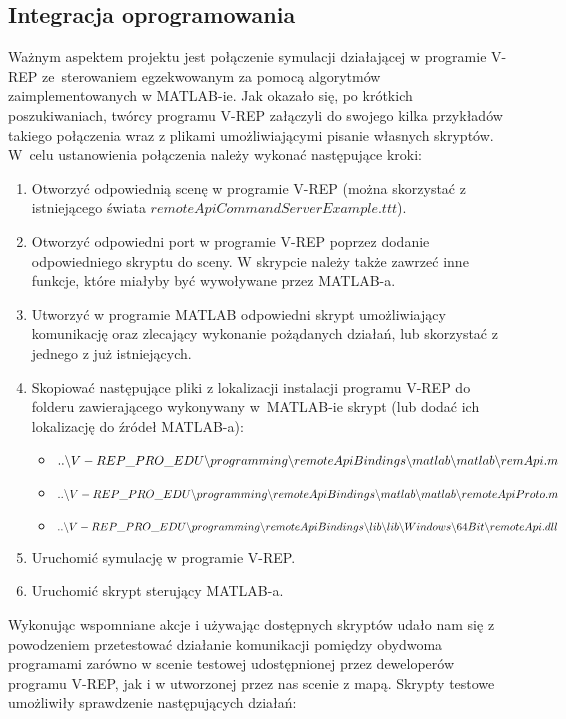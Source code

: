 \documentclass[11pt, a4paper, twoside]{article}
\begin{document}
	\subsection{Integracja oprogramowania}
	\label{subsec:integracja}
	Ważnym aspektem projektu jest połączenie symulacji działającej w programie V-REP ze~sterowaniem egzekwowanym za pomocą algorytmów zaimplementowanych w MATLAB-ie. Jak okazało się, po krótkich poszukiwaniach, twórcy programu V-REP załączyli do swojego kilka przykładów takiego połączenia wraz z plikami umożliwiającymi pisanie własnych skryptów. W~celu ustanowienia połączenia należy wykonać następujące kroki:
	\begin{enumerate}[1)]
		\item Otworzyć odpowiednią scenę w programie V-REP (można skorzystać z istniejącego świata $remoteApiCommandServerExample.ttt$).
		\item Otworzyć odpowiedni port w programie V-REP poprzez dodanie odpowiedniego skryptu do sceny. W skrypcie należy także zawrzeć inne funkcje, które miałyby być wywoływane przez MATLAB-a.
		\item Utworzyć w programie MATLAB odpowiedni skrypt umożliwiający komunikację oraz zlecający wykonanie pożądanych działań, lub skorzystać z jednego z już istniejących.
		\item Skopiować następujące pliki z lokalizacji instalacji programu V-REP do folderu zawierającego wykonywany w~MATLAB-ie skrypt (lub dodać ich lokalizację do źródeł MATLAB-a):
		\begin{itemize}
			\item $..\backslash V-REP\_PRO\_EDU\backslash programming\backslash remoteApiBindings\backslash \\matlab\backslash matlab\backslash remApi.m$
			\item $..\backslash V-REP\_PRO\_EDU\backslash programming\backslash remoteApiBindings\backslash \\matlab\backslash matlab\backslash remoteApiProto.m$
			\item $..\backslash V-REP\_PRO\_EDU\backslash programming\backslash remoteApiBindings\backslash \\lib\backslash lib\backslash Windows\backslash 64Bit\backslash remoteApi.dll$
		\end{itemize}
		\item Uruchomić symulację w programie V-REP.
		\item Uruchomić skrypt sterujący MATLAB-a.
	\end{enumerate}
	Wykonując wspomniane akcje i używając dostępnych skryptów udało nam się z powodzeniem przetestować działanie komunikacji pomiędzy obydwoma programami zarówno w scenie testowej udostępnionej przez deweloperów programu V-REP, jak i w utworzonej przez nas scenie z mapą. Skrypty testowe umożliwiły sprawdzenie następujących działań:
\end{document}
